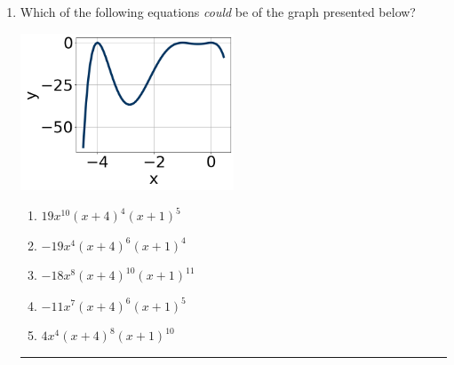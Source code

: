 \documentclass[14pt]{extbook}
\newcommand{\litem}[1]{\item#1\hspace*{-1cm}\rule{\textwidth}{0.4pt}}
\begin{document}
\begin{enumerate}
{\begin{enumerate}[label=\Alph*.]
\end{enumerate} }
\litem{
Which of the following equations \textit{could} be of the graph presented below?
\begin{center}
    \includegraphics[width=0.5\textwidth]{../Figures/polyGraphToFunctionC.png}
\end{center}
\begin{enumerate}[label=\Alph*.]
\item \( 19x^{10} (x + 4)^{4} (x + 1)^{5} \)
\item \( -19x^{4} (x + 4)^{6} (x + 1)^{4} \)
\item \( -18x^{8} (x + 4)^{10} (x + 1)^{11} \)
\item \( -11x^{7} (x + 4)^{6} (x + 1)^{5} \)
\item \( 4x^{4} (x + 4)^{8} (x + 1)^{10} \)

\end{enumerate} }
\end{enumerate}
\end{document}
